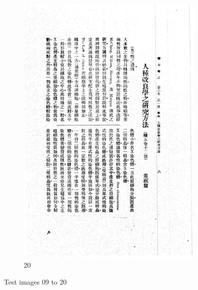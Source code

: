 \documentclass[12pt,twoside]{report}
\begin{document}
\begin{appendices}
\begin{figure}[htbp]
\begin{subfigure}[b]{0.23\linewidth}
        \includegraphics[width=\linewidth]{./figures/testset/20.jpg}
        \caption{20}
        \label{fig:test_20}
    \end{subfigure}
    \caption{Test images 09 to 20}
    \label{fig:test_09_20}
\end{figure}

\end{appendices}



\end{document}
